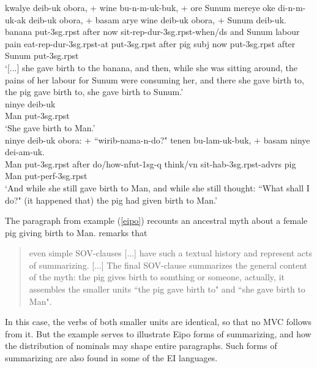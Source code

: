 \pex \label{eipo}
\a
\gll kwalye deib-uk obora, + wine bu-n-m-uk-buk, + ore Sunum mereye oke di-n-m-uk-ak deib-uk obora, + basam arye wine deib-uk obora, + Sunum deib-uk. \\
banana put-3\acs{sg}.\acs{rpst} after now sit-\acs{rep}-\acs{dur}-3\acs{sg}.\acs{rpst}-when/\acs{ds} and Sunum labour pain eat-\acs{rep}-\acs{dur}-3\acs{sg}.\acs{rpst}-at put-3\acs{sg}.\acs{rpst} after pig \acs{subj} now put-3\acs{sg}.\acs{rpst} after Sunum put-3\acs{sg}.\acs{rpst} \\
\glft `[...] she gave birth to the banana, and then, while she was sitting around, the pains of her labour for Sunum were consuming her, and there she gave birth to, the pig gave birth to, she gave birth to Sunum.' \\ 
\z
\a
\gll ninye deib-uk \\
Man put-3\acs{sg}.\acs{rpst} \\
\glft `She gave birth to Man.' \\ 
\z
\a
\gll ninye deib-uk obora: + ``wirib-nama-n-do?" tenen bu-lam-uk-buk, + basam ninye dei-am-uk. \\ 
Man put-3\acs{sg}.\acs{rpst} after do/how-\acs{nfut}-1\acs{sg}-\acs{q} think/\acs{vn} sit-\acs{hab}-3\acs{sg}.\acs{rpst}-\acs{advrs} pig Man put-\acs{perf}-3\acs{sg}.\acs{rpst} \\
\glft `And while she still gave birth to Man, and while she still thought: ``What shall I do?" (it happened that) the pig had given birth to Man.' \\ 
\z
\xe

The paragraph from example (\ref{eipo}) recounts an ancestral myth about a female pig giving birth to Man. \textcite{heeschen1998eipo} remarks that 

\begin{quote}even simple SOV-clauses [...] have such a textual history and represent acts of summarizing. [...] The final SOV-clause summarizes the general content of the myth: the pig gives birth to somthing or someone, actually, it assembles the smaller units ``the pig gave birth to" and ``she gave birth to Man".\end{quote} 

In this case, the verbs of both smaller units are identical, so that no MVC follows from it. But the example serves to illustrate Eipo forms of summarizing, and how the distribution of nominals may shape entire paragraphs. Such forms of summarizing are also found in some of the EI languages.

